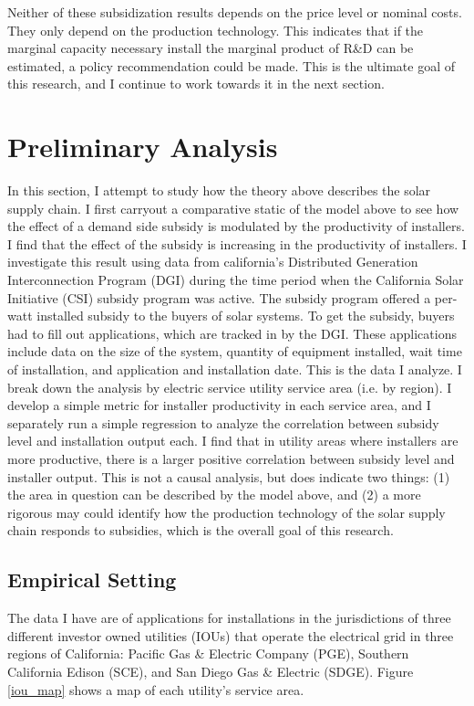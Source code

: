 \documentclass{article}
\begin{document}
Neither of these subsidization results depends on the price level or nominal costs. They only depend on the production technology. This indicates that if the marginal capacity necessary install the marginal product of R\&D can be estimated, a policy recommendation could be made. This is the ultimate goal of this research, and I continue to work towards it in the next section.

\section{Preliminary Analysis}

In this section, I attempt to study how the theory above describes the solar supply chain. I first carryout a comparative static of the model above to see how the effect of a demand side subsidy is modulated by the productivity of installers. I find that the effect of the subsidy is increasing in the productivity of installers. I investigate this result using data from california's Distributed Generation Interconnection Program (DGI) during the time period when the California Solar Initiative (CSI) subsidy program was active. The subsidy program offered a per-watt installed subsidy to the buyers of solar systems. To get the subsidy, buyers had to fill out applications, which are tracked in by the DGI. These applications include data on the size of the system, quantity of equipment installed, wait time of installation, and application and installation date. This is the data I analyze. I break down the analysis by electric service utility service area (i.e. by region). I develop a simple metric for installer productivity in each service area, and I separately run a simple regression to analyze the correlation between subsidy level and installation output each. I find that in utility areas where installers are more productive, there is a larger positive correlation between subsidy level and installer output. This is not a causal analysis, but does indicate two things: (1) the area in question can be described by the model above, and (2) a more rigorous may could identify how the production technology of the solar supply chain responds to subsidies, which is the overall goal of this research.

\subsection{Empirical Setting}

The data I have are of applications for installations in the jurisdictions of three different investor owned utilities (IOUs) that operate the electrical grid in three regions of California: Pacific Gas \& Electric Company (PGE), Southern California Edison (SCE), and San Diego Gas \& Electric (SDGE). Figure \ref{iou_map} shows a map of each utility's service area.
\end{document}
